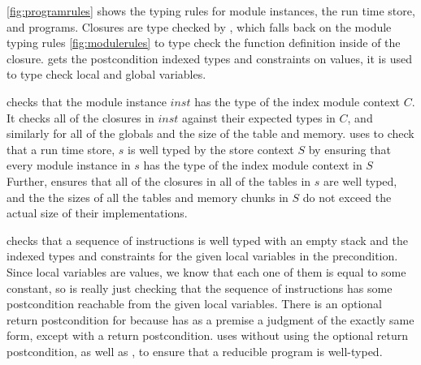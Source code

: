 \autoref{fig:programrules} shows the \name typing rules for module instances, the run time store, and \name programs.
Closures are type checked by , which falls back on the module typing rules \autoref{fig:modulerules} to type check the function definition inside of the closure.
 gets the postcondition indexed types and constraints on values, it is used to type check local and global variables.

 checks that the module instance $inst$ has the type of the index module context $C$.
It checks all of the closures in $inst$ against their expected types in $C$, and similarly for all of the globals and the size of the table and memory.
 uses  to check that a run time store, $s$ is well typed by the store context $S$ by ensuring that every module instance in $s$ has the type of the index module context in $S$
Further,  ensures that all of the closures in all of the tables in $s$ are well typed, and the the sizes of all the tables and memory chunks in $S$ do not exceed the actual size of their implementations.

 checks that a sequence of instructions is well typed with an empty stack and the indexed types and constraints for the given local variables in the precondition.
Since local variables are values, we know that each one of them is equal to some constant, so  is really just checking that the sequence of instructions has some postcondition reachable from the given local variables.
There is an optional return postcondition for  because  has as a premise a judgment of the exactly same form, except with a return postcondition.
 uses  without using the optional return postcondition, as well as , to ensure that a reducible \name program is well-typed.

